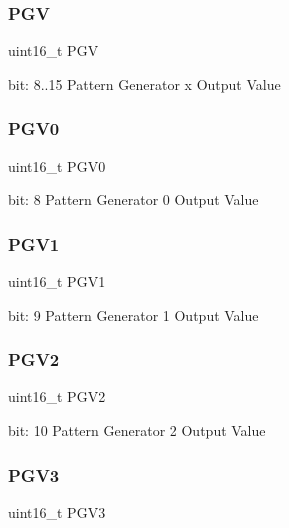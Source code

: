 \subsubsection{\texorpdfstring{PGV}{PGV}}
{\footnotesize\ttfamily uint16\+\_\+t P\+GV}

bit\+: 8..15 Pattern Generator x Output Value \mbox{\label{union_t_c_c___p_a_t_t___type_a8cd2f58616ce37d050385f23e2520a37}} 
\subsubsection{\texorpdfstring{PGV0}{PGV0}}
{\footnotesize\ttfamily uint16\+\_\+t P\+G\+V0}

bit\+: 8 Pattern Generator 0 Output Value \mbox{\label{union_t_c_c___p_a_t_t___type_a8be884f89437e1e65b38bc15e3533eb2}} 
\subsubsection{\texorpdfstring{PGV1}{PGV1}}
{\footnotesize\ttfamily uint16\+\_\+t P\+G\+V1}

bit\+: 9 Pattern Generator 1 Output Value \mbox{\label{union_t_c_c___p_a_t_t___type_a0156c9f220512d032d9431ae965485f7}} 
\subsubsection{\texorpdfstring{PGV2}{PGV2}}
{\footnotesize\ttfamily uint16\+\_\+t P\+G\+V2}

bit\+: 10 Pattern Generator 2 Output Value \mbox{\label{union_t_c_c___p_a_t_t___type_a4f8248a06489c0afb5a276bc657105ad}} 
\subsubsection{\texorpdfstring{PGV3}{PGV3}}
{\footnotesize\ttfamily uint16\+\_\+t P\+G\+V3}

